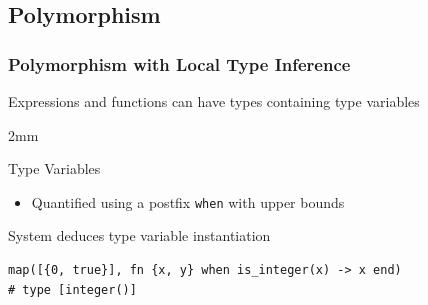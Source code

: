 \subsection{Polymorphism}
\begin{frame}[fragile]
\frametitle{Polymorphism with Local Type Inference}

\begin{block}{Expressions and functions can have types containing type variables}
\vspace{-7.2mm}
\begin{overlayarea}{\textwidth}{2mm}
\end{overlayarea} 
\hfill \vspace{1.4mm}
\vspace{-1.5mm}
\end{block}
\pause
\begin{block}{Type Variables}
    \begin{itemize}
        \item Quantified using a postfix \texttt{\color{typeBrique}when} with upper bounds
    \end{itemize}
\end{block}
\pause
\begin{block}{System deduces type variable instantiation}
\begin{verbatim}
map([{0, true}], fn {x, y} when is_integer(x) -> x end)
# type [integer()]
\end{verbatim}
\end{block}
\end{frame}



